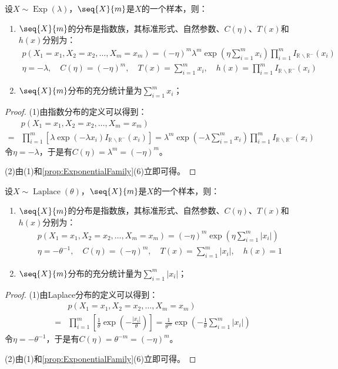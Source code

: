 \begin{theorem}
	设$X\sim\operatorname{Exp}(\lambda)$，$\seq{X}{m}$是$X$的一个样本，则：
	\begin{enumerate}
		\item $\seq{X}{m}$的分布是指数族，其标准形式、自然参数、$C(\eta)$、$T(x)$和$h(x)$分别为：
		\begin{gather*}
			p(X_1=x_1,X_2=x_2,\dots,X_m=x_m) =(-\eta)^m\lambda^m\exp\left(\eta\sum_{i=1}^{m}x_i\right)\prod_{i=1}^mI_{\mathbb{R}^{}\backslash\mathbb{R}^{-}}(x_i) \\
			\eta=-\lambda,\quad C(\eta)=(-\eta)^m,\quad
			T(x)=\sum_{i=1}^{m}x_i,\quad h(x)=\prod_{i=1}^{m}I_{\mathbb{R}^{}\backslash\mathbb{R}^{-}}(x_i)
		\end{gather*}
		\item $\seq{X}{m}$分布的充分统计量为$\sum\limits_{i=1}^{m}x_i$；
	\end{enumerate}
\end{theorem}
\begin{proof}
	(1)由指数分布的定义可以得到：
	\begin{align*}
		&p(X_1=x_1,X_2=x_2,\dots,X_m=x_m) \\
		=&\prod_{i=1}^{m}\left[\lambda\exp(-\lambda x_i)I_{\mathbb{R}^{}\backslash\mathbb{R}^{-}}(x_i)\right]=\lambda^m\exp\left(-\lambda\sum_{i=1}^{m}x_i\right)\prod_{i=1}^mI_{\mathbb{R}^{}\backslash\mathbb{R}^{-}}(x_i)
	\end{align*}
	令$\eta=-\lambda$，于是有$C(\eta)=\lambda^m=(-\eta)^m$。\par
	(2)由(1)和\cref{prop:ExponentialFamily}(6)立即可得。
\end{proof}

\begin{theorem}
	设$X\sim\operatorname{Laplace}(\theta)$，$\seq{X}{m}$是$X$的一个样本，则：
	\begin{enumerate}
		\item $\seq{X}{m}$的分布是指数族，其标准形式、自然参数、$C(\eta)$、$T(x)$和$h(x)$分别为：
		\begin{gather*}
			p(X_1=x_1,X_2=x_2,\dots,X_m=x_m) =(-\eta)^m\exp\left(\eta\sum_{i=1}^{m}|x_i|\right) \\
			\eta=-\theta^{-1},\quad C(\eta)=(-\eta)^m,\quad
			T(x)=\sum_{i=1}^{m}|x_i|,\quad h(x)=1
		\end{gather*}
		\item $\seq{X}{m}$分布的充分统计量为$\sum\limits_{i=1}^{m}|x_i|$；
	\end{enumerate}
\end{theorem}
\begin{proof}
	(1)由Laplace分布的定义可以得到：
	\begin{align*}
		&p(X_1=x_1,X_2=x_2,\dots,X_m=x_m) \\
		=&\prod_{i=1}^{m}\left[\frac{1}{\theta}\exp\left(-\frac{|x_i|}{\theta}\right)\right]=\frac{1}{\theta^m}\exp\left(-\frac{1}{\theta}\sum_{i=1}^{m}|x_i|\right)
	\end{align*}
	令$\eta=-\theta^{-1}$，于是有$C(\eta)=\theta^{-m}=(-\eta)^m$。\par
	(2)由(1)和\cref{prop:ExponentialFamily}(6)立即可得。
\end{proof}

